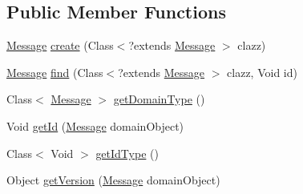 \subsection*{Public Member Functions}
\begin{DoxyCompactItemize}
\item 
\hyperlink{classcsc440_1_1nuf_1_1server_1_1_message}{Message} \hyperlink{classcsc440_1_1nuf_1_1server_1_1_message_locator_a2988c1638d0484362ea892cf03336b68}{create} (Class$<$?extends \hyperlink{classcsc440_1_1nuf_1_1server_1_1_message}{Message} $>$ clazz)
\item 
\hyperlink{classcsc440_1_1nuf_1_1server_1_1_message}{Message} \hyperlink{classcsc440_1_1nuf_1_1server_1_1_message_locator_a72aabcef006258bbd775553ad77ef570}{find} (Class$<$?extends \hyperlink{classcsc440_1_1nuf_1_1server_1_1_message}{Message} $>$ clazz, Void id)
\item 
Class$<$ \hyperlink{classcsc440_1_1nuf_1_1server_1_1_message}{Message} $>$ \hyperlink{classcsc440_1_1nuf_1_1server_1_1_message_locator_ac32fb8e799737ac0760b9d7745b27866}{get\-Domain\-Type} ()
\item 
Void \hyperlink{classcsc440_1_1nuf_1_1server_1_1_message_locator_a35330d4c31936a55a27cd472e0e6dc9c}{get\-Id} (\hyperlink{classcsc440_1_1nuf_1_1server_1_1_message}{Message} domain\-Object)
\item 
Class$<$ Void $>$ \hyperlink{classcsc440_1_1nuf_1_1server_1_1_message_locator_a4bd6ce8cd4f6668f312d43f7228ca5de}{get\-Id\-Type} ()
\item 
Object \hyperlink{classcsc440_1_1nuf_1_1server_1_1_message_locator_a18d1ac622301b5d3b13812d9e98877e0}{get\-Version} (\hyperlink{classcsc440_1_1nuf_1_1server_1_1_message}{Message} domain\-Object)
\end{DoxyCompactItemize}


